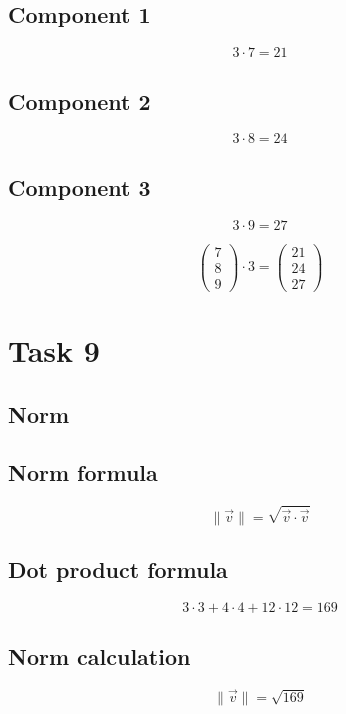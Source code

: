 \documentclass{article}
\begin{document}
\subsection*{ \vspace{1em} Component 1}
\[
3 \cdot 7 = 21
\]
\subsection*{ \vspace{1em} Component 2}
\[
3 \cdot 8 = 24
\]
\subsection*{ \vspace{1em} Component 3}
\[
3 \cdot 9 = 27
\]
\medskip

\[
\begin{pmatrix}7 \\ 8 \\ 9\end{pmatrix} \cdot 3 = \begin{pmatrix}21 \\ 24 \\ 27\end{pmatrix}
\]
\bigskip

\hrulefill
\bigskip

\section*{Task 9}

\subsection*{Norm}
\subsection*{ \vspace{1em} Norm formula}
\[
\|\vec{v}\| = \sqrt{\vec{v} \cdot \vec{v}}
\]
\subsection*{ \vspace{1em} Dot product formula}
\[
3 \cdot 3 + 4 \cdot 4 + 12 \cdot 12 = 169
\]
\subsection*{ \vspace{1em} Norm calculation}
\[
\|\vec{v}\| = \sqrt{169}
\]
\end{document}
